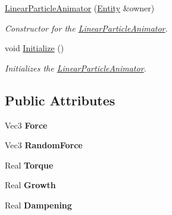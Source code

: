 \begin{DoxyCompactItemize}
\item 
\hyperlink{classDCEngine_1_1Components_1_1LinearParticleAnimator_a1dd3d9bb9a599855c16b6e51faee4c97}{Linear\-Particle\-Animator} (\hyperlink{classDCEngine_1_1Entity}{Entity} \&owner)
\begin{DoxyCompactList}\small\item\em Constructor for the \hyperlink{classDCEngine_1_1Components_1_1LinearParticleAnimator}{Linear\-Particle\-Animator}.  \end{DoxyCompactList}\item 
void \hyperlink{classDCEngine_1_1Components_1_1LinearParticleAnimator_a59f4f5fabddf0ae32b9912cc8c5d03e6}{Initialize} ()
\begin{DoxyCompactList}\small\item\em Initializes the \hyperlink{classDCEngine_1_1Components_1_1LinearParticleAnimator}{Linear\-Particle\-Animator}.  \end{DoxyCompactList}\end{DoxyCompactItemize}
\subsection*{Public Attributes}
\begin{DoxyCompactItemize}
\item 
\hypertarget{classDCEngine_1_1Components_1_1LinearParticleAnimator_ab289bd8266394ef557a68fee8343782a}{Vec3 {\bfseries Force}}\label{classDCEngine_1_1Components_1_1LinearParticleAnimator_ab289bd8266394ef557a68fee8343782a}

\item 
\hypertarget{classDCEngine_1_1Components_1_1LinearParticleAnimator_a62ddeff681f8609b9eb49820e22f7d89}{Vec3 {\bfseries Random\-Force}}\label{classDCEngine_1_1Components_1_1LinearParticleAnimator_a62ddeff681f8609b9eb49820e22f7d89}

\item 
\hypertarget{classDCEngine_1_1Components_1_1LinearParticleAnimator_ae9cba3d312748262494caeccba84da49}{Real {\bfseries Torque}}\label{classDCEngine_1_1Components_1_1LinearParticleAnimator_ae9cba3d312748262494caeccba84da49}

\item 
\hypertarget{classDCEngine_1_1Components_1_1LinearParticleAnimator_a6eeeda3388565399837a8659d8fb16a0}{Real {\bfseries Growth}}\label{classDCEngine_1_1Components_1_1LinearParticleAnimator_a6eeeda3388565399837a8659d8fb16a0}

\item 
\hypertarget{classDCEngine_1_1Components_1_1LinearParticleAnimator_ab6284b1741b5a61246a4cc50e5b27a16}{Real {\bfseries Dampening}}\label{classDCEngine_1_1Components_1_1LinearParticleAnimator_ab6284b1741b5a61246a4cc50e5b27a16}

\end{DoxyCompactItemize}
